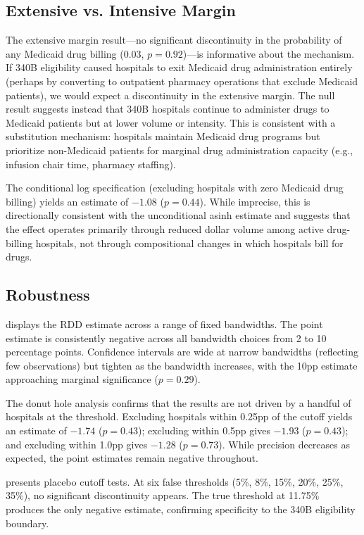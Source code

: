 \documentclass[12pt]{article}
\begin{document}
\subsection{Extensive vs. Intensive Margin}

The extensive margin result---no significant discontinuity in the probability of any Medicaid drug billing ($0.03$, $p = 0.92$)---is informative about the mechanism. If 340B eligibility caused hospitals to exit Medicaid drug administration entirely (perhaps by converting to outpatient pharmacy operations that exclude Medicaid patients), we would expect a discontinuity in the extensive margin. The null result suggests instead that 340B hospitals continue to administer drugs to Medicaid patients but at lower volume or intensity. This is consistent with a substitution mechanism: hospitals maintain Medicaid drug programs but prioritize non-Medicaid patients for marginal drug administration capacity (e.g., infusion chair time, pharmacy staffing).

The conditional log specification (excluding hospitals with zero Medicaid drug billing) yields an estimate of $-1.08$ ($p = 0.44$). While imprecise, this is directionally consistent with the unconditional asinh estimate and suggests that the effect operates primarily through reduced dollar volume among active drug-billing hospitals, not through compositional changes in which hospitals bill for drugs.

\subsection{Robustness}

 displays the RDD estimate across a range of fixed bandwidths. The point estimate is consistently negative across all bandwidth choices from 2 to 10 percentage points. Confidence intervals are wide at narrow bandwidths (reflecting few observations) but tighten as the bandwidth increases, with the 10pp estimate approaching marginal significance ($p = 0.29$).

The donut hole analysis confirms that the results are not driven by a handful of hospitals at the threshold. Excluding hospitals within 0.25pp of the cutoff yields an estimate of $-1.74$ ($p = 0.43$); excluding within 0.5pp gives $-1.93$ ($p = 0.43$); and excluding within 1.0pp gives $-1.28$ ($p = 0.73$). While precision decreases as expected, the point estimates remain negative throughout.

 presents placebo cutoff tests. At six false thresholds (5\%, 8\%, 15\%, 20\%, 25\%, 35\%), no significant discontinuity appears. The true threshold at 11.75\% produces the only negative estimate, confirming specificity to the 340B eligibility boundary.
\end{document}
